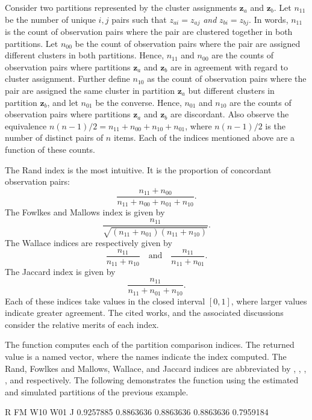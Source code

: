 \documentclass[article, nojss]{jss}
\newcommand{\bz}{\boldsymbol{z}}
\begin{document}
Consider two partitions represented by the cluster assignments $\bz_a$ and $\bz_b$. Let $n_{11}$ be the number of unique ${i,j}$ pairs such that $z_{ai} = z_{aj}$ {\it and} $z_{bi} = z_{bj}$. In words, $n_{11}$ is the count of observation pairs where the pair are clustered together in both partitions. Let $n_{00}$ be the count of observation pairs where the pair are assigned different clusters in both partitions. Hence, $n_{11}$ and $n_{00}$ are the counts of observation pairs where partitions $\bz_a$ and $\bz_b$ are in agreement with regard to cluster assignment. Further define $n_{10}$ as the count of observation pairs where the pair are assigned the same cluster in partition $\bz_a$ but different clusters in partition $\bz_b$, and let $n_{01}$ be the converse. Hence, $n_{01}$ and $n_{10}$ are the counts of observation pairs where partitions $\bz_a$ and $\bz_b$ are discordant. Also observe the equivalence $n(n-1)/2 = n_{11} + n_{00} + n_{10} + n_{01}$, where $n(n-1)/2$ is the number of distinct pairs of $n$ items. Each of the indices mentioned above are a function of these counts.

The Rand index is the most intuitive. It is the proportion of concordant observation pairs: \[\frac{n_{11}+n_{00}}{n_{11}+n_{00}+n_{01}+n_{10}}.\] The Fowlkes and Mallows index is given by \[\frac{n_{11}}{\sqrt{(n_{11}+n_{01})(n_{11}+n_{10})}}.\] The Wallace indices are respectively given by \[\frac{n_{11}}{n_{11}+n_{10}} \quad \mathrm{and} \quad \frac{n_{11}}{n_{11}+n_{01}}.\] The Jaccard index is given by \[\frac{n_{11}}{n_{11}+n_{01}+n_{10}}.\] Each of these indices take values in the closed interval $[0,1]$, where larger values indicate greater agreement. The cited works, and the associated discussions consider the relative merits of each index.

The  function computes each of the partition comparison indices. The returned value is a named vector, where the names indicate the index computed. The Rand, Fowlkes and Mallows, Wallace, and Jaccard indices are abbreviated by , , , , and  respectively. The following demonstrates the  function using the estimated and simulated partitions of the previous example.
\begin{Schunk}
\begin{Soutput}
        R        FM       W10       W01         J 
0.9257885 0.8863636 0.8863636 0.8863636 0.7959184 
\end{Soutput}
\end{Schunk}
\end{document}
